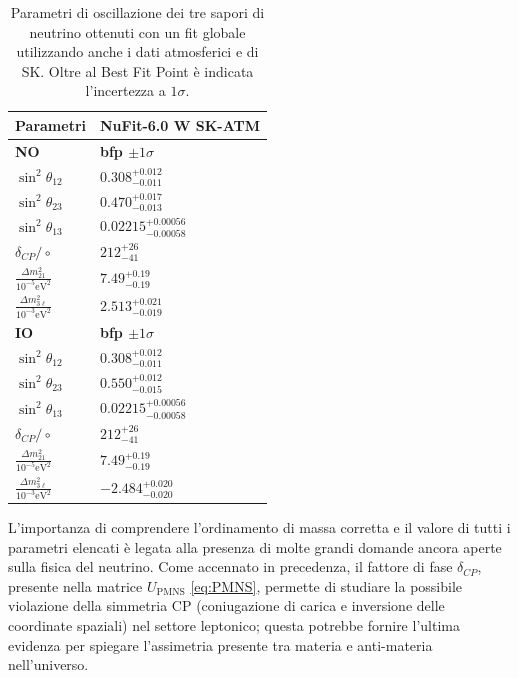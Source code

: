 \begin{table}[h!]
\centering
\renewcommand{\arraystretch}{1.3}
\begin{tabular}{l @{\hspace{2cm}} l}
\toprule
\textbf{Parametri} & \textbf{NuFit-6.0 \cite{esteban2024nufit60updatedglobalanalysis} W SK-ATM} \\ 
\midrule
\textbf{NO} & \textbf{bfp $\pm 1\sigma$} \\ 
\midrule
$\sin^2 \theta_{12}$     & $0.308^{+0.012}_{-0.011}$ \\
$\sin^2 \theta_{23}$     & $0.470^{+0.017}_{-0.013}$ \\
$\sin^2 \theta_{13}$     & $0.02215^{+0.00056}_{-0.00058}$ \\
$\delta_{CP}/\circ$                     & $212^{+26}_{-41}$ \\
$\frac{\Delta m^2_{21}}{10^{-5} \text{eV}^2}$ & $7.49^{+0.19}_{-0.19}$ \\
$\frac{\Delta m^2_{3\ell}}{10^{-3} \text{eV}^2}$ & $2.513^{+0.021}_{-0.019}$ \\
\midrule
\textbf{IO} & \textbf{bfp $\pm 1\sigma$} \\ 
\midrule
$\sin^2 \theta_{12}$     & $0.308^{+0.012}_{-0.011}$ \\
$\sin^2 \theta_{23}$     & $0.550^{+0.012}_{-0.015}$ \\
$\sin^2 \theta_{13}$     & $0.02215^{+0.00056}_{-0.00058}$ \\
$\delta_{CP}/\circ$                     & $212^{+26}_{-41}$ \\
$\frac{\Delta m^2_{21}}{10^{-5} \text{eV}^2}$ & $7.49^{+0.19}_{-0.19}$ \\
$\frac{\Delta m^2_{3\ell}}{10^{-3} \text{eV}^2}$ & $-2.484^{+0.020}_{-0.020}$ \\
\bottomrule
\end{tabular}
\caption{Parametri di oscillazione dei tre sapori di neutrino ottenuti con un fit globale utilizzando anche i dati atmosferici e di SK. Oltre al Best Fit Point è indicata l'incertezza a $1\sigma$.}
\label{tab:val}
\end{table}
L'importanza di comprendere l'ordinamento di massa corretta e il valore di tutti i parametri elencati è legata alla presenza di molte grandi domande ancora aperte sulla fisica del neutrino. Come accennato in precedenza, il fattore di fase $\delta_{CP}$, presente nella matrice $U_{\text{PMNS}}$ \ref{eq:PMNS}, permette di studiare la possibile violazione della simmetria CP (coniugazione di carica e inversione delle coordinate spaziali) nel settore leptonico; questa potrebbe fornire l'ultima evidenza per spiegare l'assimetria presente tra materia e anti-materia nell'universo.

